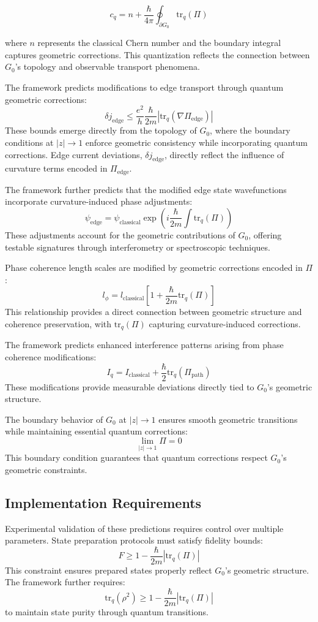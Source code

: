 \documentclass[10pt]{article}
\begin{document}
\[
c_q = n + \frac{\hbar}{4\pi}\oint_{\partial G_0} \text{tr}_q(\Pi)
\]

where $n$ represents the classical Chern number and the boundary integral captures geometric corrections. This quantization reflects the connection between $G_0$'s topology and observable transport phenomena.

The framework predicts modifications to edge transport through quantum geometric corrections:
\[
\delta j_{\text{edge}} \leq \frac{e^2}{h} \frac{\hbar}{2m} \left|\text{tr}_q(\nabla\Pi_{\text{edge}})\right|
\]
These bounds emerge directly from the topology of $G_0$, where the boundary conditions at $|z| \to 1$ enforce geometric consistency while incorporating quantum corrections. Edge current deviations, $\delta j_{\text{edge}}$, directly reflect the influence of curvature terms encoded in $\Pi_{\text{edge}}$.

The framework further predicts that the modified edge state wavefunctions incorporate curvature-induced phase adjustments:
\[
\psi_{\text{edge}} = \psi_{\text{classical}} \exp\left(i \frac{\hbar}{2m} \int \text{tr}_q(\Pi)\right)
\]
These adjustments account for the geometric contributions of $G_0$, offering testable signatures through interferometry or spectroscopic techniques.

Phase coherence length scales are modified by geometric corrections encoded in $\Pi$:
\[
l_\phi = l_{\text{classical}} \left[1 + \frac{\hbar}{2m} \text{tr}_q(\Pi)\right]
\]
This relationship provides a direct connection between geometric structure and coherence preservation, with $\text{tr}_q(\Pi)$ capturing curvature-induced corrections.

The framework predicts enhanced interference patterns arising from phase coherence modifications:
\[
I_q = I_{\text{classical}} + \frac{\hbar}{2} \text{tr}_q(\Pi_{\text{path}})
\]
These modifications provide measurable deviations directly tied to $G_0$'s geometric structure.

The boundary behavior of $G_0$ at $|z| \to 1$ ensures smooth geometric transitions while maintaining essential quantum corrections:
\[
\lim_{|z| \to 1} \Pi = 0
\]
This boundary condition guarantees that quantum corrections respect $G_0$'s geometric constraints.

\subsection{Implementation Requirements}

Experimental validation of these predictions requires control over multiple parameters. State preparation protocols must satisfy fidelity bounds:
\[
F \geq 1 - \frac{\hbar}{2m}|\text{tr}_q(\Pi)|
\]
This constraint ensures prepared states properly reflect $G_0$'s geometric structure. The framework further requires:
\[
\text{tr}_q(\rho^2) \geq 1 - \frac{\hbar}{2m}|\text{tr}_q(\Pi)|
\]
to maintain state purity through quantum transitions.
\end{document}
